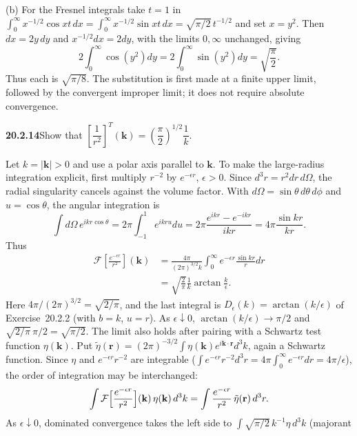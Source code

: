 (b) For the Fresnel integrals take $t=1$ in
$\int_0^\infty x^{-1/2}\cos xt\,dx=\int_0^\infty x^{-1/2}\sin xt\,dx
=\sqrt{\pi/2}\,t^{-1/2}$ and set $x=y^2$. Then $dx=2y\,dy$ and
$x^{-1/2}dx=2dy$, with the limits $0,\infty$ unchanged, giving
\[
2\int_0^\infty\cos(y^2)dy
=2\int_0^\infty\sin(y^2)dy=\sqrt{\frac\pi2}.
\]
Thus each is $\boxed{\sqrt{\pi/8}}$. The substitution is first
made at a finite upper limit, followed by the convergent improper
limit; it does not require absolute convergence.

\par\bigskip
\noindent\textbf{20.2.14}\quad Show that
$\left[\dfrac{1}{r^{2}}\right]^{T}\!\!(\mathbf{k})
=\left(\dfrac{\pi}{2}\right)^{1/2}\dfrac{1}{k}$.
\par{}
\solution
Let $k=|\mathbf k|>0$ and use a polar axis parallel
to $\mathbf k$. To make the large-radius integration explicit,
first multiply $r^{-2}$ by $e^{-\epsilon r}$, $\epsilon>0$.
Since $d^3r=r^2dr\,d\Omega$, the radial singularity cancels
against the volume factor. With
$d\Omega=\sin\theta\,d\theta\,d\phi$ and $u=\cos\theta$, the
angular integration is
\[
\int d\Omega\,e^{ikr\cos\theta}
=2\pi\int_{-1}^1e^{ikru}du
=2\pi\frac{e^{ikr}-e^{-ikr}}{ikr}=4\pi\frac{\sin kr}{kr}.
\]
Thus
\begin{align*}
\mathcal F\left[\frac{e^{-\epsilon r}}{r^2}\right](\mathbf k)
&=\frac{4\pi}{(2\pi)^{3/2}k}
\int_0^\infty e^{-\epsilon r}\frac{\sin kr}{r}dr\\
&=\sqrt{\frac2\pi}\frac1k\arctan\frac{k}{\epsilon}.
\end{align*}
Here $4\pi/(2\pi)^{3/2}=\sqrt{2/\pi}$, and the last integral is
$D_\epsilon(k)=\arctan(k/\epsilon)$ of Exercise~20.2.2 (with $b=k$,
$u=r$). As $\epsilon\downarrow0$, $\arctan(k/\epsilon)\to\pi/2$ and
$\sqrt{2/\pi}\,\pi/2=\sqrt{\pi/2}$. The limit also holds after
pairing with a Schwartz test function $\eta(\mathbf k)$. Put
$\tilde\eta(\mathbf r)=(2\pi)^{-3/2}\int\eta(\mathbf k)
e^{i\mathbf k\cdot\mathbf r}d^3k$, again a Schwartz function. Since
$\eta$ and $e^{-\epsilon r}r^{-2}$ are integrable
($\int e^{-\epsilon r}r^{-2}d^3r=4\pi\int_0^\infty e^{-\epsilon r}dr
=4\pi/\epsilon$), the order of integration may be interchanged:
\[
\int\mathcal F\Bigl[\frac{e^{-\epsilon r}}{r^2}\Bigr](\mathbf k)\,
\eta(\mathbf k)\,d^3k
=\int\frac{e^{-\epsilon r}}{r^2}\,\tilde\eta(\mathbf r)\,d^3r.
\]
As $\epsilon\downarrow0$, dominated convergence takes the left side
to $\int\sqrt{\pi/2}\,k^{-1}\eta\,d^3k$ (majorant
